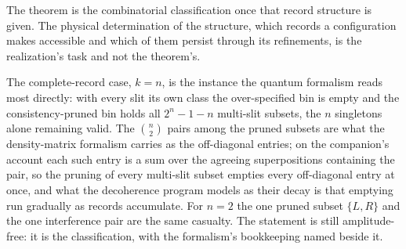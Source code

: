 \noindent The theorem is the combinatorial classification once that record structure is given. The physical determination of the structure, which records a configuration makes accessible and which of them persist through its refinements, is the realization's task and not the theorem's.

\noindent The complete-record case, $k = n$, is the instance the quantum formalism reads most directly: with every slit its own class the over-specified bin is empty and the consistency-pruned bin holds all $2^{n} - 1 - n$ multi-slit subsets, the $n$ singletons alone remaining valid. The $\binom{n}{2}$ pairs among the pruned subsets are what the density-matrix formalism carries as the off-diagonal entries; on the companion's account each such entry is a sum over the agreeing superpositions containing the pair, so the pruning of every multi-slit subset empties every off-diagonal entry at once, and what the decoherence program models as their decay \cite{zurek2003} is that emptying run gradually as records accumulate. For $n = 2$ the one pruned subset $\{L, R\}$ and the one interference pair are the same casualty. The statement is still amplitude-free: it is the classification, with the formalism's bookkeeping named beside it.



